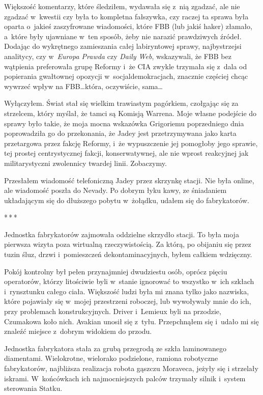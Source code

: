 \documentclass[oneside,polish,12pt,sfheadings]{mwbk}
\newcommand{\threeast}{\bigskip\par\centerline{*\,*\,*}\medskip\par}%
\begin{document}
Większość komentarzy, które śledziłem, wydawała się z~nią zgadzać, ale
nie zgadzać w~kwestii czy była to kompletna fałszywka, czy raczej ta
sprawa była oparta o~jakieś zaszyfrowane wiadomości, które FBB (lub
jakiś haker) złamało, a~które były ujawniane w~ten sposób, żeby nie
narazić prawdziwych źródeł. Dodając do wykrętnego zamieszania całej
labiryntowej sprawy, najbystrzejsi analitycy, czy w~\emph{Europa Prawda}
czy \emph{Daily Web}, wskazywali, że FBB bez wątpienia preferowała grupę
Reformy i~że CIA zwykle trzymała się z~dala od popierania gwałtownej
opozycji w~socjaldemokracjach, znacznie częściej chcąc wywrzeć wpływ na
FBB\ldots która, oczywiście, sama\ldots

Wyłączyłem. Świat stał się wielkim trawiastym pagórkiem, czołgając się
za strzelcem, który myślał, że tamci są Komisją Warrena. Moje własne
podejście do sprawy było takie, że moja mocna wskazówka Grigoriemu
poprzedniego dnia poprowadziła go do przekonania, że Jadey jest
przetrzymywana jako karta przetargowa przez fakcję Reformy, i~że
wypuszczenie jej pomogłoby jego sprawie, tej prostej centrystycznej
fakcji, konserwatywnej, ale nie wprost reakcyjnej jak militarystyczni
zwolennicy twardej linii. Zobaczymy.

Przesłałem wiadomość telefoniczną Jadey przez skrzynkę stacji. Nie była
online, ale wiadomość poszła do Nevady. Po dobrym łyku kawy, ze
śniadaniem układającym się do dłuższego pobytu w~żołądku, udałem się do
fabrykatorów.

\threeast

Jednostka fabrykatorów zajmowała oddzielne skrzydło stacji. To była moja
pierwsza wizyta poza wirtualną rzeczywistością. Za którą, po obijaniu
się przez tuzin śluz, drzwi i~pomieszczeń dekontaminacyjnych, byłem
całkiem wdzięczny.

Pokój kontrolny był pełen przynajmniej dwudziestu osób, oprócz pięciu
operatorów, którzy litościwie byli w~stanie ignorować to wszystko w~ich
szkłach i~rynsztunku całego ciała. Większość ludzi była mi znana tylko
jako nazwiska, które pojawiały się w~mojej przestrzeni roboczej, lub
wywoływały mnie do ich, przy problemach konstrukcyjnych. Driver i~Lemieux byli na przodzie, Czumakowa koło nich. Avakian unosił się z~tyłu. Przepchnąłem się i~udało mi się znaleźć miejsce z~dobrym widokiem
do przodu.

Jednostka fabrykatora stała za grubą przegrodą ze szkła laminowanego
diamentami. Wielokrotne, wielorako podzielone, ramiona robotyczne
fabrykatorów, najbliższa realizacja robota gąszczu Moraveca, jeżyły się
i strzelały iskrami. W~końcówkach ich najmocniejszych palców trzymały
silnik i~system sterowania Statku.
\end{document}
